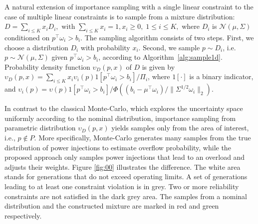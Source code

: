 A natural extension of importance sampling with a single linear constraint to the case of multiple linear constraints is to sample from a mixture distribution: 
    $D = \sum_{i \le K} x_i D_i, \text{ with } \sum_{i\le K} x_i = 1, x_i \ge 0, \; 1\le i \le K,$
where $D_i$ is $\mathcal{N}(\mu,\Sigma)$ conditioned on $p^\top\omega_i > \!b_i$. 
%
The sampling algorithm consists of two steps. First, we choose a distribution $D_i$ with probability $x_i$. Second, we sample $p \sim D_i$, i.e. $p\sim \mathcal{N}(\mu,\Sigma)$ given $p^\top\omega_i>b_i$, according to Algorithm~\ref{alg:sample1d}.
%
Probability density function $\upsilon_D(p, x)$ of $D$ is given by
    $\upsilon_D(p, x) = \sum\limits_{i\le K} x_i \upsilon_i(p) 1[p^\top \omega_i > b_i]/\Pi_i$,
where $1[\cdot]$ is a binary indicator, and 
$%
    \upsilon_i(p) = \upsilon(p) 1[p^\top\omega_i > b_i]/\Phi((b_i - \mu^\top\omega_i)/\|\Sigma^{1/2}\omega_i\|_2).
$%

In contrast to the classical Monte-Carlo, which explores the uncertainty space uniformly according to the nominal distribution, importance sampling from parametric distribution $\upsilon_D(p,x)$ yields samples only from the area of interest, i.e., $p\not\in P$. 
More specifically, Monte-Carlo generates many samples from the true distribution of power injections to estimate overflow probability, while the proposed approach only samples power injections that lead to an overload and adjusts their weights.
Figure \ref{fig:00} illustrates the difference. The white area stands for generations that do not exceed operating limits. A set of generations leading to at least one constraint violation is in grey. Two or more reliability constraints are not satisfied in the dark grey area. The samples from a nominal distribution and the constructed mixture are marked in red and green respectively.

